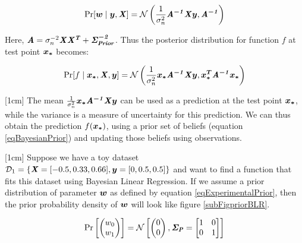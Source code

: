 \begin{equation}\label{eqBayesianPosterior}
\Pr[\boldsymbol{w} \mid \boldsymbol{y}, \bm{\mathit{X}}]  = \mathcal{N}\left ( \frac{1}{\sigma_{n}^{2}} \bm{\mathit{A^{-1}}}\bm{\mathit{X}}\boldsymbol{y} , \bm{\mathit{A^{-1}}} \right )
\end{equation}

Here, $\bm{\mathit{A}} = \sigma_{n}^{-2}\bm{\mathit{X}}\bm{\mathit{X^{T}}} + \bm{\mathit{\Sigma_{Prior}^{-2}}}$. Thus the posterior distribution for function $f$ at test point $\boldsymbol{x_{*}}$ becomes:

\begin{equation}\label{eqBayesianFunctionalPosterior}
\Pr[f \mid \boldsymbol{x_{*}}, \bm{\mathit{X}}, \boldsymbol{y}]  = \mathcal{N}\left ( \frac{1}{\sigma_{n}^{2}} \boldsymbol{x_{*}}\bm{\mathit{A^{-1}}}\bm{\mathit{X}}\boldsymbol{y} , \boldsymbol{x_{*}^T}\bm{\mathit{A^{-1}}}\boldsymbol{x_{*}} \right )
\end{equation}

[1cm]
The mean $\frac{1}{\sigma_{n}^{2}} \boldsymbol{x_{*}}\bm{\mathit{A^{-1}}}\bm{\mathit{X}}\boldsymbol{y}$ can be used as a prediction at the test point $\boldsymbol{x_{*}}$, while the variance is a measure of uncertainty for this prediction. We can thus obtain the prediction $f(\boldsymbol{x_{*}})$, using a prior set of beliefs (equation \ref{eqBayesianPrior}) and updating those beliefs using observations. 

\begin{mdframed}[hidealllines=true,backgroundcolor=lightgray!20]
[1cm]
Suppose we have a toy dataset $\mathcal{D}_{1} = \{\bm{\mathit{X}} = [-0.5, 0.33, 0.66], \boldsymbol{y} = [0, 0.5, 0.5]\}$ and want to find a function that fits this dataset using Bayesian Linear Regression. If we assume a prior distribution of parameter $\boldsymbol{w}$ as defined by equation \ref{eqExperimentalPrior}, then the prior probability density of $\boldsymbol{w}$ will look like figure \ref{subFigpriorBLR}.

\begin{equation}\label{eqExperimentalPrior}
\Pr \left [\begin{pmatrix}
w_{0}\\ 
w_{1}
\end{pmatrix} \right ] = \mathcal{N}\left [ \begin{pmatrix}
0\\ 
0
\end{pmatrix}, \bm{\mathit{\Sigma_{P}}} = \begin{bmatrix}
1 & 0\\ 
0 & 1
\end{bmatrix} \right ]
\end{equation}
\end{mdframed}

